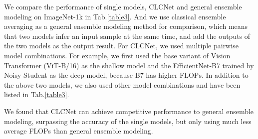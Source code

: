 \documentclass{article}
\begin{document}
We compare the performance of single models, CLCNet and general ensemble modeling on ImageNet-1k in Tab.\ref{table3}. And we use classical ensemble averaging as a general ensemble modeling method for comparison, which means that two models infer an input sample at the same time, and add the outputs of the two models as the output result. For CLCNet, we used multiple pairwise model combinations. For example, we first used the base variant of Vision Transformer (ViT-B/16) \cite{dosovitskiy2020image} as the shallow model and the EfficientNet-B7 trained by Noisy Student \cite{xie2020self} as the deep model, because B7 has higher FLOPs. In addition to the above two models, we also used other model combinations and have been listed in Tab.\ref{table3}.


We found that CLCNet can achieve competitive performance to general ensemble modeling, surpassing the accuracy of the single models, but only using much less average FLOPs than general ensemble modeling.
\end{document}
